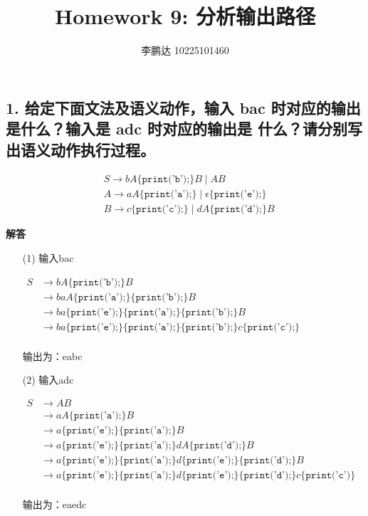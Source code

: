 \documentclass[a4paper, body={18cm,22cm}]{article}
\title{Homework 9: 分析输出路径}
\author{李鹏达 10225101460}
\date{}
\begin{document}
\maketitle

\subsection*{1. 给定下面文法及语义动作，输入 bac 时对应的输出是什么？输入是 adc 时对应的输出是
什么？请分别写出语义动作执行过程。}

\[
\begin{aligned}
    & S \to bA\{\texttt{print('b');}\}B \mid AB \\
    & A \to aA\{\texttt{print('a');}\} \mid \epsilon \{\texttt{print('e');}\} \\
    & B \to c \{\texttt{print('c');}\} \mid dA\{\texttt{print('d');}\}B
\end{aligned}
\]

\noindent\textbf{{\heiti 解答}}\\ 

\begin{enumerate}
    \item[(1)] 输入bac

$\begin{aligned}
    S &\to bA\{\texttt{print('b');}\}B \\
    &\to baA\{\texttt{print('a');}\}\{\texttt{print('b');}\}B \\
    &\to ba\{\texttt{print('e');}\}\{\texttt{print('a');}\}\{\texttt{print('b');}\}B \\
    &\to ba\{\texttt{print('e');}\}\{\texttt{print('a');}\}\{\texttt{print('b');}\}c\{\texttt{print('c');}\} \\
\end{aligned}$

输出为：eabc

    \item[(2)] 输入adc

$\begin{aligned}
    S &\to AB \\
    &\to aA\{\texttt{print('a');}\}B \\
    &\to a\{\texttt{print('e');}\}\{\texttt{print('a');}\}B \\
    &\to a\{\texttt{print('e');}\}\{\texttt{print('a');}\}dA\{\texttt{print('d');}\}B \\
    &\to a\{\texttt{print('e');}\}\{\texttt{print('a');}\}d\{\texttt{print('e');}\}\{\texttt{print('d');}\}B \\
    &\to a\{\texttt{print('e');}\}\{\texttt{print('a');}\}d\{\texttt{print('e');}\}\{\texttt{print('d');}\}c\{\texttt{print('c')}\} \\
\end{aligned}$

输出为：eaedc
\end{enumerate}
\end{document}
